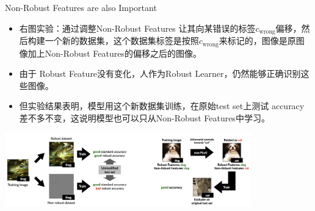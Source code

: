 \begin{frame}{Non-Robust Features are also Important}
    \begin{itemize}
        \item 右图实验：通过调整Non-Robust Features 让其向某错误的标签$c_\text{wrong}$偏移，然后构建一个新的数据集，这个数据集标签是按照$c_\text{wrong}$来标记的，图像是原图像加上Non-Robust Features的偏移之后的图像。
        \item 由于 Robust Feature没有变化，人作为Robust Learner，仍然能够正确识别这些图像。
        \item 但实验结果表明，模型用这个新数据集训练，在原始test set上测试 accuracy 差不多不变，这说明模型也可以只从Non-Robust Features中学习。
    \end{itemize}
    \begin{center}
        \includegraphics[width=0.8\textwidth]{assets/rml.png}
    \end{center}
\end{frame}


